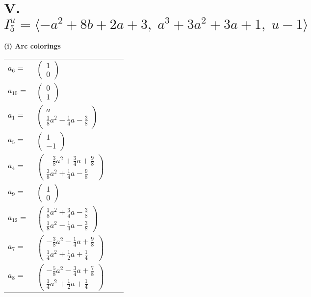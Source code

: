 \documentclass[1p]{elsarticle_modified}
\theoremstyle{definition}
\begin{document}
\centering \section*{V. $I^u_{5}= \langle - a^2+8 b+2 a+3,\;a^3+3 a^2+3 a+1,\;u-1 \rangle$}
\flushleft \textbf{(i) Arc colorings}\\
\begin{tabular}{m{7pt} m{180pt} m{7pt} m{180pt} }
\flushright $a_{6}=$&$\begin{pmatrix}1\\0\end{pmatrix}$ \\
\flushright $a_{10}=$&$\begin{pmatrix}0\\1\end{pmatrix}$ \\
\flushright $a_{1}=$&$\begin{pmatrix}a\\\frac{1}{8} a^2-\frac{1}{4} a-\frac{3}{8}\end{pmatrix}$ \\
\flushright $a_{5}=$&$\begin{pmatrix}1\\-1\end{pmatrix}$ \\
\flushright $a_{4}=$&$\begin{pmatrix}-\frac{3}{8} a^2+\frac{3}{4} a+\frac{9}{8}\\\frac{3}{8} a^2+\frac{1}{4} a-\frac{9}{8}\end{pmatrix}$ \\
\flushright $a_{9}=$&$\begin{pmatrix}1\\0\end{pmatrix}$ \\
\flushright $a_{12}=$&$\begin{pmatrix}\frac{1}{8} a^2+\frac{3}{4} a-\frac{3}{8}\\\frac{1}{8} a^2-\frac{1}{4} a-\frac{3}{8}\end{pmatrix}$ \\
\flushright $a_{7}=$&$\begin{pmatrix}-\frac{3}{8} a^2-\frac{1}{4} a+\frac{9}{8}\\\frac{1}{4} a^2+\frac{1}{2} a+\frac{1}{4}\end{pmatrix}$ \\
\flushright $a_{8}=$&$\begin{pmatrix}-\frac{5}{8} a^2-\frac{3}{4} a+\frac{7}{8}\\\frac{1}{4} a^2+\frac{1}{2} a+\frac{1}{4}\end{pmatrix}$ \\

\end{tabular}
\end{document}
